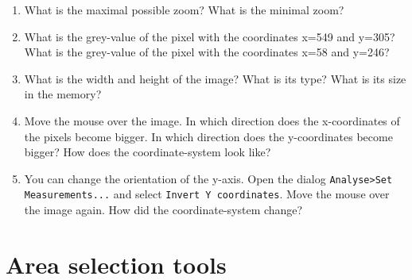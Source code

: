 \begin{enumerate}

\item What is the maximal possible zoom? What is the minimal zoom?

\fbox{
	\begin{minipage}{\linewidth}
		\hfill\vspace{1cm}
	\end{minipage}
	}
	
\item What is the grey-value of the pixel with the coordinates x=549 and y=305? What is the grey-value of the pixel with the coordinates x=58 and y=246?

\fbox{
	\begin{minipage}{\linewidth}
		\hfill\vspace{1cm}
	\end{minipage}
	}
	
\item What is the width and height of the image? What is its type? What is its size in the memory?

\fbox{
	\begin{minipage}{\linewidth}
		\hfill\vspace{1cm}
	\end{minipage}
	}
	
\item Move the mouse over the image. In which direction does the x-coordinates of the pixels become bigger. In which direction does the y-coordinates become bigger? How does the coordinate-system look like?

\fbox{
	\begin{minipage}{\linewidth}
		\hfill\vspace{2cm}
	\end{minipage}
	}
	
\item You can change the orientation of the y-axis. Open the dialog \texttt{Analyse>Set Measurements...} and select \texttt{Invert Y coordinates}. Move the mouse over the image again. How did the coordinate-system change?

\fbox{
	\begin{minipage}{\linewidth}
		\hfill\vspace{2cm}
	\end{minipage}
	}
	
\end{enumerate}

\section{Area selection tools}

